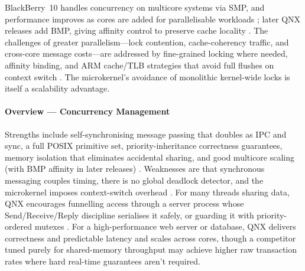 BlackBerry~10 handles concurrency on multicore systems via SMP, and
performance improves as cores are added for parallelisable workloads
\citep{qnx_smp_multicore}; later QNX releases add BMP, giving affinity
control to preserve cache locality \citep{qnx_neutrino_overview}.
The challenges of greater parallelism---lock contention,
cache-coherency traffic, and cross-core message costs---are addressed
by fine-grained locking where needed, affinity binding, and ARM
cache/TLB strategies that avoid full flushes on context switch
\citep{qnx_ham, qnx_arm_memory}. The
microkernel's avoidance of monolithic kernel-wide locks is itself a
scalability advantage.

\paragraph{Overview --- Concurrency Management}

Strengths include self-synchronising message passing that doubles as
IPC and sync, a full POSIX primitive set, priority-inheritance
correctness guarantees, memory isolation that eliminates accidental
sharing, and good multicore scaling (with BMP affinity in later
releases) \citep{qnx_kernel_sysarch, qnx_ipc, qnx_smp_multicore,
qnx_neutrino_overview}. Weaknesses are that
synchronous messaging couples timing, there is no global deadlock
detector, and the microkernel imposes context-switch overhead
\citep{qnx_arm_memory}. For many threads sharing data, QNX encourages
funnelling access through a server process whose Send/Receive/Reply
discipline serialises it safely, or guarding it with priority-ordered
mutexes \citep{qnx_kernel_sysarch, qnx_ipc}. For a high-performance
web server or database, QNX delivers correctness and predictable
latency and scales across cores, though a competitor tuned purely for
shared-memory throughput may achieve higher raw transaction rates
where hard real-time guarantees aren't required.
